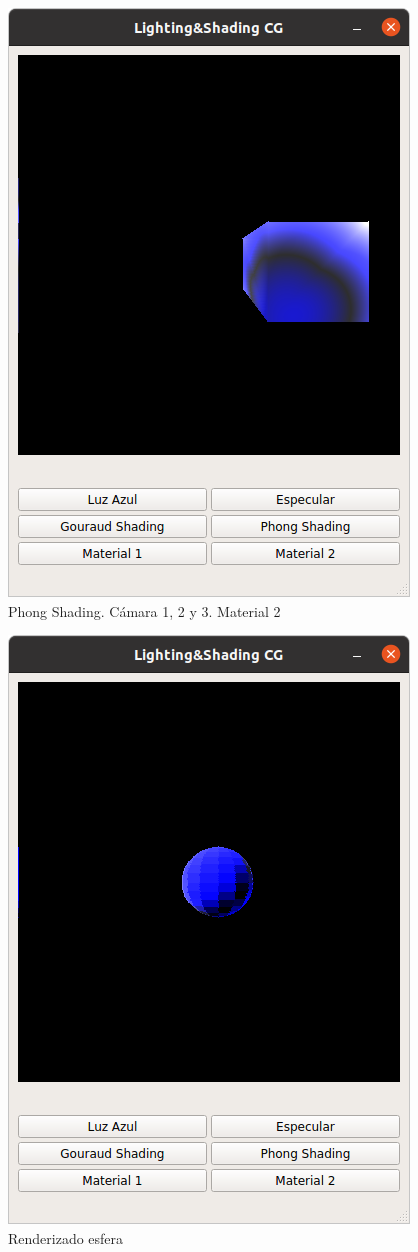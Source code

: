 \documentclass[12pt]{article}
\begin{document}
\begin{figure}[H]
\includegraphics[scale=0.5]{images/ej6.png}
\caption{Phong Shading. Cámara 1, 2 y 3. Material 2}
\end{figure}


\begin{figure}[H]
\centering
\includegraphics[scale=0.5]{images/esfera.png}

\caption{Renderizado esfera}
\end{figure}
\end{document}
